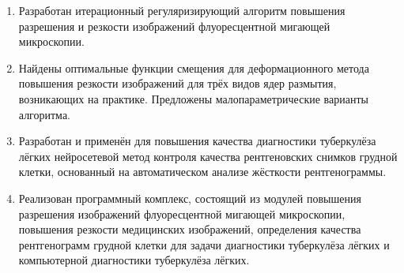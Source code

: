 \begin {enumerate}[beginpenalty=10000]
	\item Разработан итерационный регуляризирующий алгоритм повышения разрешения и резкости изображений флуоресцентной мигающей микроскопии.
	
	\item Найдены оптимальные функции смещения для деформационного метода повышения резкости изображений для трёх видов ядер размытия, возникающих на практике. Предложены малопараметрические варианты алгоритма.
	
	\item Разработан и применён для повышения качества диагностики туберкулёза лёгких нейросетевой метод контроля качества рентгеновских снимков грудной клетки, основанный на автоматическом анализе жёсткости рентгенограммы.
	
	\item Реализован программный комплекс, состоящий из модулей повышения разрешения изображений флуоресцентной мигающей микроскопии, повышения резкости медицинских изображений, определения качества рентгенограмм грудной клетки для задачи диагностики туберкулёза лёгких и компьютерной диагностики туберкулёза лёгких.
\end {enumerate}

